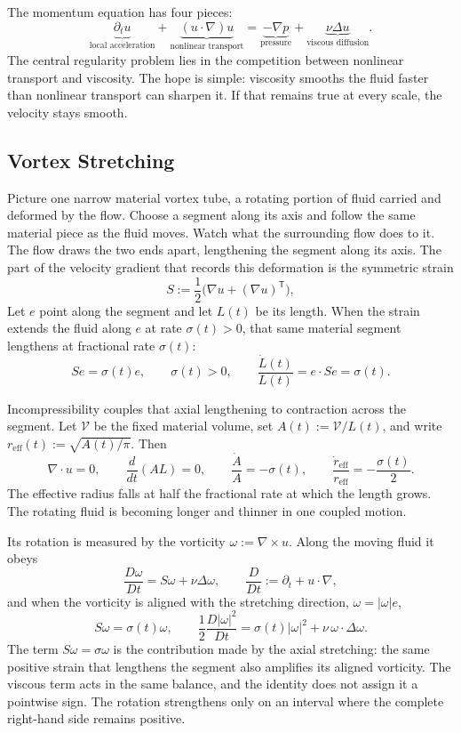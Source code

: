 
The momentum equation has four pieces:
\[
  \underbrace{\partial_t u}_{\text{local acceleration}}
  +
  \underbrace{(u\cdot\nabla)u}_{\text{nonlinear transport}}
  =
  \underbrace{-\nabla p}_{\text{pressure}}
  +
  \underbrace{\nu\Delta u}_{\text{viscous diffusion}}.
\]
The central regularity problem lies in the competition between nonlinear transport and viscosity.
The hope is simple: viscosity smooths the fluid faster than nonlinear transport can sharpen it.
If that remains true at every scale, the velocity stays smooth.

\subsection{Vortex Stretching}\label{sub:ThePerfectlyStretchingVortex}

Picture one narrow material vortex tube, a rotating portion of fluid carried and deformed by the flow.
Choose a segment along its axis and follow the same material piece as the fluid moves.
Watch what the surrounding flow does to it.
The flow draws the two ends apart, lengthening the segment along its axis.
The part of the velocity gradient that records this deformation is the symmetric strain
\[
  S:=\frac12\bigl(\nabla u+(\nabla u)^{\mathsf T}\bigr),
\]
Let \(e\) point along the segment and let \(L(t)\) be its length.
When the strain extends the fluid along \(e\) at rate \(\sigma(t)>0\), that same material segment lengthens at fractional rate \(\sigma(t)\):
\[
  Se=\sigma(t)e,
  \qquad
  \sigma(t)>0,
  \qquad
  \frac{\dot L(t)}{L(t)}
  =
  e\cdot Se
  =
  \sigma(t).
\]

Incompressibility couples that axial lengthening to contraction across the segment.
Let \(\mathcal V\) be the fixed material volume, set \(A(t):=\mathcal V/L(t)\), and write \(r_{\mathrm{eff}}(t):=\sqrt{A(t)/\pi}\).
Then
\[
  \nabla\cdot u=0,
  \qquad
  \frac{d}{dt}(A L)=0,
  \qquad
  \frac{\dot A}{A}=-\sigma(t),
  \qquad
  \frac{\dot r_{\mathrm{eff}}}{r_{\mathrm{eff}}}
  =
  -\frac{\sigma(t)}{2}.
\]
The effective radius falls at half the fractional rate at which the length grows.
The rotating fluid is becoming longer and thinner in one coupled motion.

Its rotation is measured by the vorticity \(\omega:=\nabla\times u\).
Along the moving fluid it obeys
\[
  \frac{D\omega}{Dt}
  =
  S\omega+\nu\Delta\omega,
  \qquad
  \frac{D}{Dt}
  :=
  \partial_t+u\cdot\nabla,
\]
and when the vorticity is aligned with the stretching direction, \(\omega=|\omega|e\),
\[
  S\omega
  =
  \sigma(t)\omega,
  \qquad
  \frac12\frac{D|\omega|^2}{Dt}
  =
  \sigma(t)|\omega|^2
  +
  \nu\,\omega\cdot\Delta\omega.
\]
The term \(S\omega=\sigma\omega\) is the contribution made by the axial stretching: the same positive strain that lengthens the segment also amplifies its aligned vorticity.
The viscous term acts in the same balance, and the identity does not assign it a pointwise sign.
The rotation strengthens only on an interval where the complete right-hand side remains positive.

